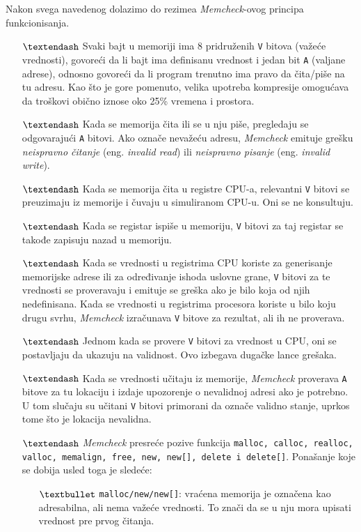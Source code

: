 \documentclass[12pt,oneside]{memoir}
\theoremstyle{plain}
\theoremstyle{definition}
\begin{document}
Nakon svega navedenog dolazimo do rezimea \textit{Memcheck}-ovog principa funkcionisanja.
\begin{itemize}
\item[$\textendash$] Svaki bajt u memoriji ima 8 pridruženih \texttt{V} bitova (važeće vrednosti), govoreći da li bajt ima definisanu vrednost i jedan bit \texttt{A} (valjane adrese), odnosno govoreći da li program trenutno ima pravo da čita/piše na tu adresu. Kao što je gore pomenuto, velika upotreba kompresije omogućava da troškovi obično iznose oko 25\% vremena i prostora.
\item[$\textendash$] Kada se memorija čita ili se u nju piše, pregledaju se odgovarajući \texttt{A} bitovi. Ako označe nevažeću adresu, \textit{Memcheck} emituje grešku \textit{neispravno čitanje} (eng. \textit{invalid read}) ili \textit{neispravno pisanje} (eng. \textit{invalid write}).
\item[$\textendash$] Kada se memorija čita u registre CPU-a, relevantni \texttt{V} bitovi se preuzimaju iz memorije i čuvaju u simuliranom CPU-u. Oni se ne konsultuju.
\item[$\textendash$] Kada se registar ispiše u memoriju, \texttt{V} bitovi za taj registar se takođe zapisuju nazad u memoriju.
\item[$\textendash$] Kada se vrednosti u registrima CPU koriste za generisanje memorijske adrese ili za određivanje ishoda uslovne grane, \texttt{V} bitovi za te vrednosti se proveravaju i emituje se greška ako je bilo koja od njih nedefinisana. Kada se vrednosti u registrima procesora koriste u bilo koju drugu svrhu, \textit{Memcheck} izračunava \texttt{V} bitove za rezultat, ali ih ne proverava.
\item[$\textendash$] Jednom kada se provere \texttt{V} bitovi za vrednost u CPU, oni se postavljaju da ukazuju na validnost. Ovo izbegava dugačke lance grešaka.
\item[$\textendash$] Kada se vrednosti učitaju iz memorije, \textit{Memcheck} proverava \texttt{A} bitove za tu lokaciju i izdaje upozorenje o nevalidnoj adresi ako je potrebno. U tom slučaju su učitani \texttt{V} bitovi primorani da označe validno stanje, uprkos tome što je lokacija nevalidna. 
\item[$\textendash$] \textit{Memcheck} presreće pozive funkcija \texttt{malloc, calloc, realloc, valloc, memalign, free, new, new[], delete i delete[]}. Ponašanje koje  se dobija usled toga je sledeće:
	\begin{itemize}
	\item[$\textbullet$] \texttt{malloc/new/new[]}: vraćena memorija je označena kao adresabilna, ali nema važeće vrednosti. To znači da se u nju mora upisati vrednost pre prvog čitanja.

\end{itemize}
\end{itemize}
\end{document}
